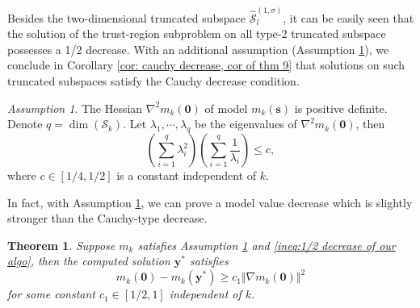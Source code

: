 \documentclass[colorlinks=true, linkcolor=blue, citecolor=blue, urlcolor=blue]{article}
\theoremstyle{plain}
\newtheorem{theorem}{Theorem}[section]
\theoremstyle{definition}
\theoremstyle{remark}
\newtheorem{assumption}{Assumption}
\begin{document}
Besides the two-dimensional truncated subspace $\hat{\mathcal{S}}_{l}^{(1,\sigma)}$, it can be easily seen that the solution of the trust-region subproblem on all type-2 truncated subspace possesses a 1/2 decrease. With an additional assumption (Assumption \ref{assumption: cauchy}), we conclude in Corollary \ref{cor: cauchy decrease, cor of thm 9} that solutions on such truncated subspaces satisfy the Cauchy decrease condition.
\begin{assumption}\label{assumption: cauchy}
    The Hessian $\nabla^2m_k(\bm 0)$ of model $m_k(\bm s)$
    is positive definite. Denote $q=\dim(\mathcal{S}_k)$.
    Let $\lambda_1,\cdots,\lambda_q$ be the eigenvalues of $\nabla^2m_k(\bm 0)$, then 
    \begin{equation*}  \left(\sum_{i=1}^q\lambda_i^2\right)\left(\sum_{i=1}^q\frac{1}{\lambda_i}\right)\leq c,
    \end{equation*}
    where $c\in[1/4,1/2]$ is a constant independent of $k$.
\end{assumption}


In fact, with Assumption \ref{assumption: cauchy}, we can prove a model value decrease which is slightly stronger than the Cauchy-type decrease.
\begin{theorem}
Suppose $m_k$ satisfies Assumption \ref{assumption: cauchy} and \eqref{ineq:1/2 decrease of our algo}, then the computed solution $\bm y^*$ satisfies
\begin{equation}\label{ineq:pre_cauchy decrease}
    m_k(\bm 0)-m_k(\bm y^*)\geq c_1\Vert\nabla m_k(\bm 0)\Vert^2
\end{equation}
for some constant $c_1\in[1/2,1]$ independent of $k$.
\end{theorem}
\end{document}
